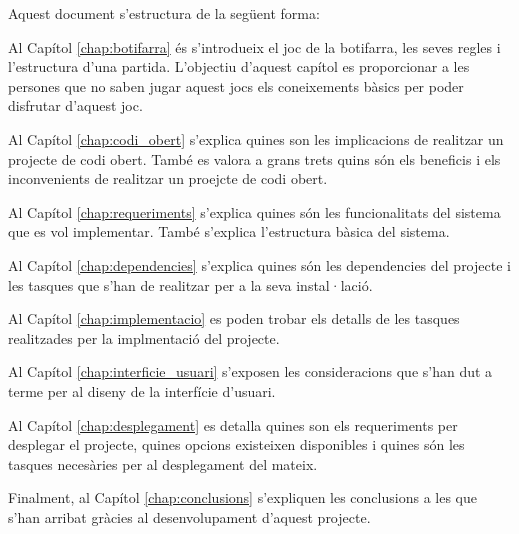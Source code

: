 Aquest document s'estructura de la següent forma: 

Al Capítol \ref{chap:botifarra} és s'introdueix el joc de la botifarra, les seves regles i l'estructura d'una partida. L'objectiu d'aquest capítol es proporcionar a les persones que no saben jugar aquest jocs els coneixements bàsics per poder disfrutar d'aquest joc. 

Al Capítol \ref{chap:codi_obert} s'explica quines son les implicacions de realitzar un projecte de codi obert. També es valora a grans trets quins són els beneficis i els inconvenients de realitzar un proejcte de codi obert.

Al Capítol \ref{chap:requeriments} s'explica quines són les funcionalitats del sistema que es vol implementar. També s'explica l'estructura bàsica del sistema. 

Al Capítol \ref{chap:dependencies} s'explica quines són les dependencies del projecte i les tasques que s'han de realitzar per a la seva instal·lació. 

Al Capítol \ref{chap:implementacio} es poden trobar els detalls de les tasques realitzades per la implmentació del projecte. 

Al Capítol \ref{chap:interficie_usuari} s'exposen les consideracions que s'han dut a terme per al diseny de la interfície d'usuari.

Al Capítol \ref{chap:desplegament} es detalla quines son els requeriments per desplegar el projecte, quines opcions existeixen disponibles i quines són les tasques necesàries per al desplegament del mateix. 

Finalment, al Capítol \ref{chap:conclusions} s'expliquen les conclusions a les que s'han arribat gràcies al desenvolupament d'aquest projecte. 
